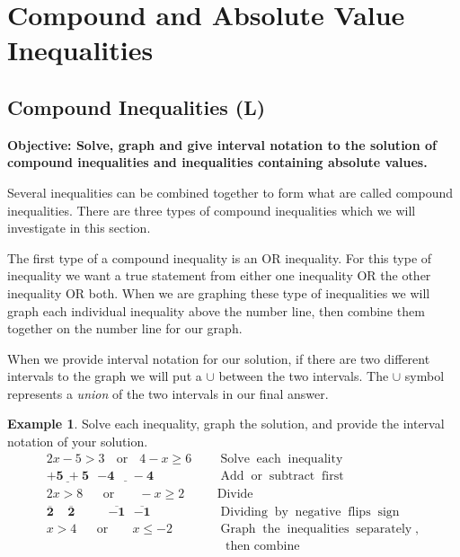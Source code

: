 \documentclass[12pt]{book}
\theoremstyle{definition}
\newtheorem{example}{Example}
\newcommand{\tmmathbf}[1]{\ensuremath{\boldsymbol{#1}}}
\newcommand{\tmop}[1]{\ensuremath{\operatorname{#1}}}
\begin{document}
\section{Compound and Absolute Value Inequalities}
\subsection{Compound Inequalities (L)}
{\bf Objective: Solve, graph and give interval notation to the solution of compound inequalities and inequalities containing absolute values.}\par
Several inequalities can be combined together to form what are called compound inequalities. There are three types of compound inequalities which we will investigate in this section.\par
The first type of a compound inequality is an OR inequality. For this type of inequality we want a true statement from either one inequality OR the other inequality OR both. When we are graphing these type of inequalities we will graph each individual inequality above the number line, then combine them together on the number line for our graph.\par
When we provide interval notation for our solution, if there are two different intervals to the graph we will put a $\cup$ between the two intervals. The $\cup$ symbol represents a {\it union} of the two intervals in our final answer.\par
\begin{example}\label{Lin100} Solve each inequality, graph the solution, and provide the interval notation of your solution.
  \begin{eqnarray*}
    2 x - 5 > 3 \tmop{~~or~~} 4 - x \geq 6~~ &  & \tmop{Solve} \tmop{each}
    \tmop{inequality}\\
    \tmmathbf{\underline{+ 5 ~ + 5}} ~~~ \tmmathbf{\underline{- 4 ~~~~~~ - 4}} &  & \tmop{Add} \tmop{or}
    \tmop{subtract} \tmop{first}\\
    2 x > 8 \tmop{~~~~or~~~~~} - x \geq 2~~ &  & \tmop{Divide}\\
    \tmmathbf{\overline{2} ~~~~~ \overline{2}} ~~~~~~~~~~~~ \tmmathbf{\overline{- 1} ~~~ \overline{- 1}} &  &
    \tmop{Dividing} \tmop{by} \tmop{negative} \tmop{flips} \tmop{sign}\\
    x > 4 \tmop{~~~~or~~~~~} x \leq - 2~~ &  & \tmop{Graph} \tmop{the}
    \tmop{inequalities} \tmop{separately},\\
		& & ~~~\tmop{then~combine}
  \end{eqnarray*}
\end{example}
\end{document}
